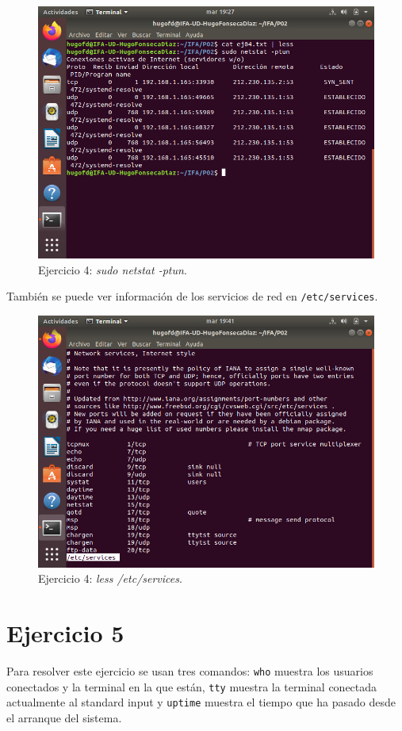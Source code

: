 \documentclass[11pt]{article}
\begin{document}
\begin{figure}[H]
    \caption{Ejercicio 4: \textit{sudo netstat -ptun}.}
  \centering
  \includegraphics[scale=0.7]{e4-2.png}
\end{figure}

También se puede ver información de los servicios de red en \verb|/etc/services|.

\begin{figure}[H]
    \caption{Ejercicio 4: \textit{less /etc/services}.}
  \centering
  \includegraphics[scale=0.7]{e4-3.png}
\end{figure}

\section{Ejercicio 5}
Para resolver este ejercicio se usan tres comandos: \verb|who| muestra los usuarios conectados y la terminal en la que están, \verb|tty| muestra la terminal conectada actualmente al standard input y \verb|uptime| muestra el tiempo que ha pasado desde el arranque del sistema.
\end{document}
